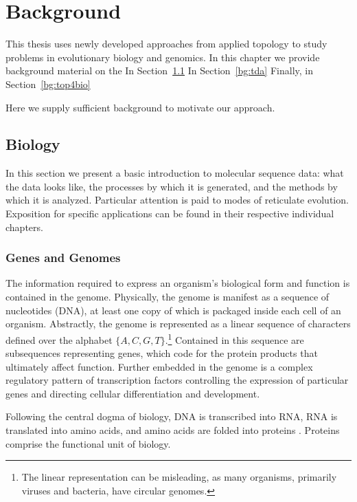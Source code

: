 \chapter{Background}
\label{ch:background}

This thesis uses newly developed approaches from applied topology to study problems in evolutionary biology and genomics.
In this chapter we provide background material on the 
In Section~\ref{bg:bio}
In Section~\ref{bg:tda}
Finally, in Section~\ref{bg:top4bio}

Here we supply sufficient background to motivate our approach.

\section{Biology}
\label{bg:bio}

In this section we present a basic introduction to molecular sequence data: what the data looks like, the processes by which it is generated, and the methods by which it is analyzed.
Particular attention is paid to modes of reticulate evolution.
Exposition for specific applications can be found in their respective individual chapters.

\subsection{Genes and Genomes}
\label{bg:bio:genes}

The information required to express an organism's biological form and function is contained in the genome.
Physically, the genome is manifest as a sequence of nucleotides (DNA), at least one copy of which is packaged inside each cell of an organism.
Abstractly, the genome is represented as a linear sequence of characters defined over the alphabet $\{A,C,G,T\}$.\footnote{The linear representation can be misleading, as many organisms, primarily viruses and bacteria, have circular genomes.}
Contained in this sequence are subsequences representing genes, which code for the protein products that ultimately affect function.
Further embedded in the genome is a complex regulatory pattern of transcription factors controlling the expression of particular genes and directing cellular differentiation and development.

Following the central dogma of biology, DNA is transcribed into RNA, RNA is translated into amino acids, and amino acids are folded into proteins \cite{Crick:1970wb}.
Proteins comprise the functional unit of biology.

